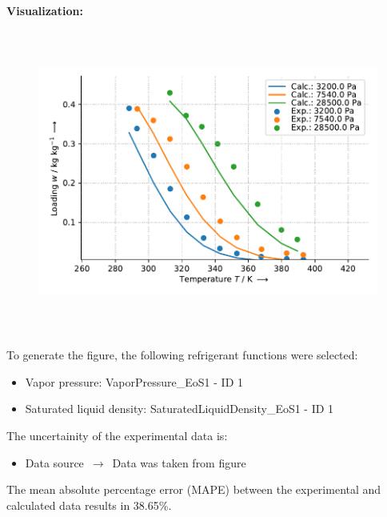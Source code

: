 \textbf{Visualization:}
%
\begin{figure}[!htp]
{\noindent\includegraphics[height=10cm, keepaspectratio]{figs/ads/ads_Methanol_activated_carbon_RUETGERS_CG1-3_DubininAstakhov_1.pdf}}
\end{figure}
%

To generate the figure, the following refrigerant functions were selected:
\begin{itemize}
\item Vapor pressure: VaporPressure\_EoS1 - ID 1
\item Saturated liquid density: SaturatedLiquidDensity\_EoS1 - ID 1
\end{itemize}

The uncertainity of the experimental data is:
\begin{itemize}
\item Data source $\,\to\,$ Data was taken from figure
\end{itemize}

The mean absolute percentage error (MAPE) between the experimental and calculated data results in 38.65\%.
\FloatBarrier
\newpage
